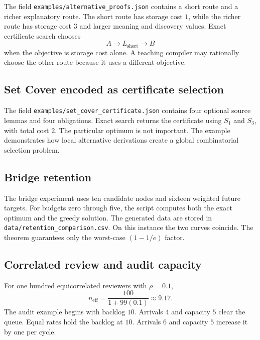 The field \texttt{examples/alternative\_proofs.json} contains a short route and a richer explanatory route. The short route has storage cost $1$, while the richer route has storage cost $3$ and larger meaning and discovery values. Exact certificate search chooses
\[
A\longrightarrow L_{\mathrm{short}}\longrightarrow B
\]
when the objective is storage cost alone. A teaching compiler may rationally choose the other route because it uses a different objective.

\subsection{Set Cover encoded as certificate selection}

The field \texttt{examples/set\_cover\_certificate.json} contains four optional source lemmas and four obligations. Exact search returns the certificate using $S_1$ and $S_3$, with total cost $2$. The particular optimum is not important. The example demonstrates how local alternative derivations create a global combinatorial selection problem.

\subsection{Bridge retention}

The bridge experiment uses ten candidate nodes and sixteen weighted future targets. For budgets zero through five, the script computes both the exact optimum and the greedy solution. The generated data are stored in \texttt{data/retention\_comparison.csv}. On this instance the two curves coincide. The theorem guarantees only the worst-case $(1-1/e)$ factor.

\subsection{Correlated review and audit capacity}

For one hundred equicorrelated reviewers with $\rho=0.1$,
\[
n_{\mathrm{eff}}
=
\frac{100}{1+99(0.1)}
\approx 9.17.
\]
The audit example begins with backlog $10$. Arrivals $4$ and capacity $5$ clear the queue. Equal rates hold the backlog at $10$. Arrivals $6$ and capacity $5$ increase it by one per cycle.

